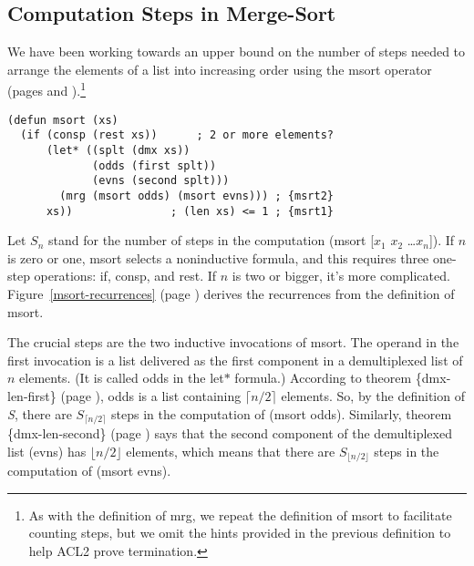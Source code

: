 \subsection{Computation Steps in Merge-Sort}
\label{subsec:msort-steps}

We have been working towards an upper bound on the number of steps
needed to arrange the elements of a list into increasing order
using the \textsf{msort} operator
(pages \pageref{defun:msort} and \pageref{defun:msort-copy}).\footnote{As
with the definition of \textsf{mrg}, we repeat the definition of \textsf{msort}
to facilitate counting steps, but we omit the hints
provided in the previous definition to help ACL2 prove termination.}

\begin{code}
\begin{verbatim}
(defun msort (xs)
  (if (consp (rest xs))      ; 2 or more elements?
      (let* ((splt (dmx xs))
             (odds (first splt))
             (evns (second splt)))
        (mrg (msort odds) (msort evns))) ; {msrt2}
      xs))               ; (len xs) <= 1 ; {msrt1}
\end{verbatim}
\end{code}
\label{defun:msort-copy}

Let $S_n$ stand for the number of steps in the computation
\textsf{(msort [$x_1$ $x_2$ \dots $x_n$])}.
If $n$ is zero or one, \textsf{msort} selects a noninductive
formula, and this requires three one-step operations:
\textsf{if}, \textsf{consp}, and \textsf{rest}.
If $n$ is two or bigger, it's more complicated.
Figure~\ref{msort-recurrences} (page \pageref{msort-recurrences})
derives the recurrences from the definition of \textsf{msort}.

The crucial steps are the two inductive invocations of \textsf{msort}.
The operand in the first invocation is a list delivered as the first component in
a demultiplexed list of $n$ elements.
(It is called \textsf{odds} in the \textsf{let$*$} formula.)
According to theorem \{dmx-len-first\} (page \pageref{thm:dmx-length-first-second}),
\textsf{odds} is a list containing $\lceil  n/2\rceil$ elements.
So, by the definition of \emph{S},
there are $S_{\lceil n/2\rceil}$ steps in the computation of \textsf{(msort odds)}.
Similarly, theorem  \{dmx-len-second\} (page \pageref{thm:dmx-length-first-second})
says that the second component of the demultiplexed list (\textsf{evns})
has $\lfloor n/2\rfloor$ elements, which means that there are
$S_{\lfloor n/2\rfloor}$ steps in the computation of \textsf{(msort evns)}.

